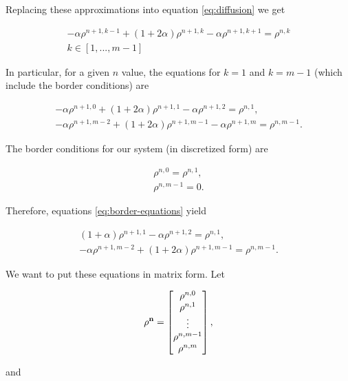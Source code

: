 Replacing these approximations into equation \ref{eq:diffusion} we get

\begin{align}
    -\alpha \rho^{n+1,k-1} + ( 1 + 2\alpha ) \rho^{n+1,k} -\alpha \rho^{n+1,k+1} =  \rho^{n,k}\\
    k \in [1, ... , m-1]
    \label{eq:equations-n}
\end{align}

In particular, for a given $n$ value,  the equations for $k=1$ and $k=m-1$ (which include the border conditions) are

\begin{align}
    -\alpha \rho^{n+1,0} + ( 1 + 2\alpha ) \rho^{n+1,1} -\alpha \rho^{n+1,2} = \rho^{n,1},\\
    -\alpha \rho^{n+1,m-2} + ( 1 + 2\alpha ) \rho^{n+1,m-1} -\alpha \rho^{n+1,m} = \rho^{n,m-1}.
    \label{eq:border-equations}
\end{align}

The border conditions for our system (in discretized form) are

\begin{align}
    \rho^{n, 0} = \rho^{n, 1}, \\
    \rho^{n, m-1} = 0.
\end{align}

Therefore, equations \ref{eq:border-equations} yield

\begin{align}
    ( 1 + \alpha ) \rho^{n+1,1} -\alpha \rho^{n+1,2} = \rho^{n,1},\\
    -\alpha \rho^{n+1,m-2} + ( 1 + 2\alpha ) \rho^{n+1,m-1} = \rho^{n,m-1}.
\end{align}

We want to put these equations in matrix form. Let 

\begin{align}
    \bf{\rho^n} = \begin{bmatrix}
                    \rho^{n, 0} \\
                    \rho^{n, 1} \\
                    \vdots \\
                    \rho^{n, m-1} \\
                    \rho^{n, m} \\
                    \end{bmatrix},
\end{align}

and 

